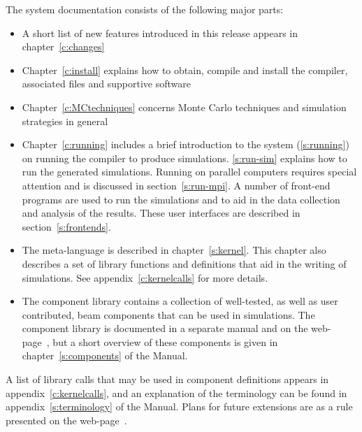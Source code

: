 The \MCX system documentation consists of the following major
parts:
\begin{itemize}
\item A short list of new features introduced in this \MCX release
  appears in chapter~\ref{c:changes}
\item Chapter~\ref{c:install} explains how to obtain, compile
  and install the \MCX compiler, associated files and supportive software
\item Chapter~\ref{c:MCtechniques} concerns Monte Carlo techniques
  and simulation strategies in general
\item Chapter~\ref{c:running} includes a brief introduction to the
  \MCX system (\cref{s:running}) on running the compiler to produce
  simulations. \cref{s:run-sim} explains how to run the generated
  simulations. Running \MCX on parallel computers requires special
  attention and is discussed in section~\ref{s:run-mpi}. A number of front-end programs are used to run the
  simulations and to aid in the data collection and analysis of the
  results. These user interfaces are described in section~\ref{s:frontends}.
\item The \MCX meta-language is described in chapter~\ref{s:kernel}. This
  chapter also describes a set of library functions and definitions
  that aid in the writing of simulations. See
  appendix~\ref{c:kernelcalls} for more details.
\item The \MCX component library contains a collection of
  well-tested, as well as user contributed, beam components that can be used in simulations.
  The \MCX component library is documented in a separate manual
  and on the \MCX web-page~\cite{mcxtrace_webpage}, but a short overview of these
  components is given in chapter~\ref{s:components} of the Manual.
\end{itemize}

A list of library calls that may be used in component definitions
appears in appendix~\ref{c:kernelcalls}, and
an explanation of the \MCX terminology can be
found in appendix~\ref{s:terminology} of the Manual.
Plans for future extensions are as a rule presented on the \MCX web-page~\cite{mcxtrace_webpage}.


